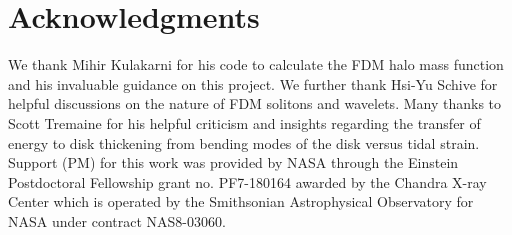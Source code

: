 \documentclass[usenatbib]{mnras}
\begin{document}
\section*{Acknowledgments}
We thank Mihir Kulakarni for his code to calculate the FDM halo mass function and his invaluable guidance on this project. We further thank Hsi-Yu Schive for helpful discussions on the nature of FDM solitons and wavelets. Many thanks to Scott Tremaine for his helpful criticism and insights regarding the transfer of energy to disk thickening from bending modes of the disk versus tidal strain. Support (PM) for this work was provided by NASA through the Einstein Postdoctoral Fellowship grant no. PF7-180164 awarded by the Chandra X-ray Center which is operated by the Smithsonian Astrophysical Observatory for NASA under contract NAS8-03060. 





 
\end{document}
